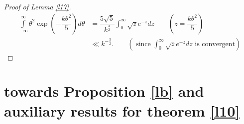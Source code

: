 \documentclass[12pt]{amsart}
\numberwithin{equation}{section}
\theoremstyle{remark}
\theoremstyle{remark}
\theoremstyle{definition}
\begin{document}
\q*
\begin{proof}[Proof of Lemma \ref{l17}]
\label{Proof of Lemma 3.3}
\begin{align}
\nonumber
\displaystyle\int\limits_{-\infty}^{\infty} \theta^2\exp\left( - \dfrac{k\theta^2}{5} \right)d\theta  &= \dfrac{5\sqrt{5}}{k^{\frac{3}{2}}}\displaystyle\int_{0}^{\infty}\sqrt{z}e^{-z}dz \qquad \left(z=\dfrac{k\theta^2}{5}\right)\\
\nonumber
&\ll k^{-\frac{3}{2}}. \qquad \left( \text{ since }\displaystyle\int_{0}^{\infty}\sqrt{z}e^{-z}dz \text{ is convergent} \right)
\end{align}
\end{proof}
\section{towards Proposition \ref{lb} and auxiliary results for theorem \ref{l10}}\label{lf}
\end{document}
